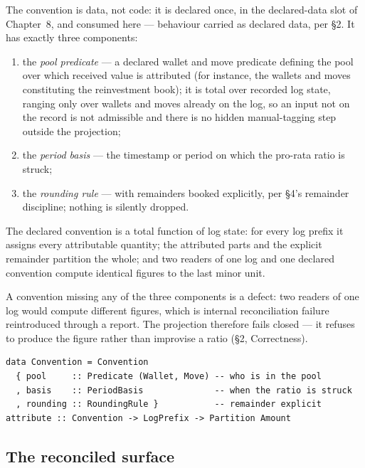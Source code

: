 The convention is data, not code: it is declared once, in the declared-data
slot of Chapter~8, and consumed here --- behaviour carried as declared data,
per \S 2. It has exactly three components:

\begin{enumerate}[nosep]
\item the \emph{pool predicate} --- a declared wallet and move predicate
  defining the pool over which received value is attributed (for instance, the
  wallets and moves constituting the reinvestment book); it is total over recorded
  log state, ranging only over wallets and moves already on the log, so an input not
  on the record is not admissible and there is no hidden manual-tagging step outside
  the projection;
\item the \emph{period basis} --- the timestamp or period on which the pro-rata
  ratio is struck;
\item the \emph{rounding rule} --- with remainders booked explicitly, per
  \S 4's remainder discipline; nothing is silently dropped.
\end{enumerate}

\begin{principle}\label{prin:attr-total}
The declared convention is a total function of log state: for every log prefix
it assigns every attributable quantity; the attributed parts and the explicit
remainder partition the whole; and two readers of one log and one declared
convention compute identical figures to the last minor unit.
\end{principle}

A convention missing any of the three components is a defect: two readers of
one log would compute different figures, which is internal reconciliation
failure reintroduced through a report. The projection therefore fails closed
--- it refuses to produce the figure rather than improvise a ratio (\S 2,
Correctness).

\begin{lstlisting}
data Convention = Convention
  { pool     :: Predicate (Wallet, Move) -- who is in the pool
  , basis    :: PeriodBasis              -- when the ratio is struck
  , rounding :: RoundingRule }           -- remainder explicit
attribute :: Convention -> LogPrefix -> Partition Amount
\end{lstlisting}

\subsection{The reconciled surface}

